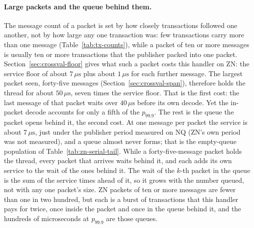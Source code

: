 \documentclass[11pt]{article}
\begin{document}
\paragraph{Large packets and the queue behind them.} The message count of a packet is set
by how closely transactions followed one another, not by how large any one transaction
was: few transactions carry more than one message (Table~\ref{tab:tx-counts}), while a
packet of ten or more messages is usually ten or more transactions that the publisher
packed into one packet. Section~\ref{sec:crossval-floor} gives what such a packet costs this
handler on ZN: the service floor of about $7\,\mu\mathrm{s}$ plus about $1\,\mu\mathrm{s}$ for
each further message. The largest packet seen, forty-five messages
(Section~\ref{sec:crossval-span}), therefore holds the thread for about $50\,\mu\mathrm{s}$,
seven times the service floor. That is the first cost: the last message of that packet waits
over $40\,\mu\mathrm{s}$ before its own decode. Yet the in-packet decode accounts for only a
fifth of the $p_{99.9}$. The rest is the queue the packet opens behind it, the second cost.
At one message per packet the service is about $7\,\mu\mathrm{s}$, just under the publisher period measured on NQ (ZN's own period was not measured), and a queue almost never forms;
that is the empty-queue population of Table~\ref{tab:zn-serial-tail}. While a forty-five-message packet holds the thread, every packet that arrives waits
behind it, and each adds its own service to the wait of the ones behind it. The wait of
the $k$-th packet in the queue is the sum of the service times ahead of it, so it grows
with the number queued, not with any one packet's size. ZN packets of ten or more messages are fewer than
one in two hundred, but each is a burst of transactions that this handler pays for twice,
once inside the packet and once in the queue behind it, and the hundreds of microseconds at
$p_{99.9}$ are those queues.
\end{document}
